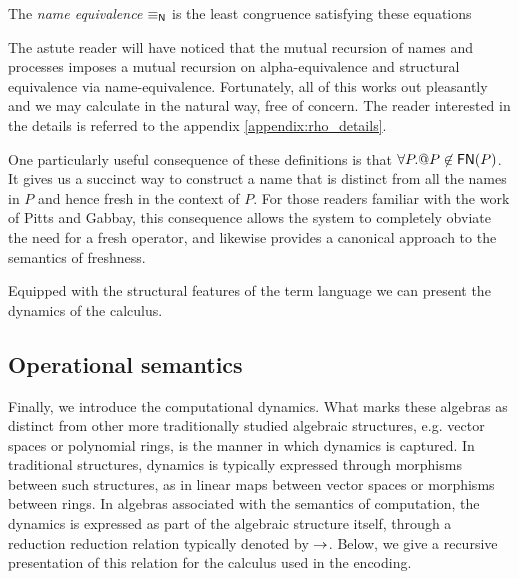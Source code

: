 \begin{definition}
  The {\em name equivalence} $\mathsf{\equiv_N}$ is the least congruence
  satisfying these equations
\end{definition}

The astute reader will have noticed that the mutual recursion of names
and processes imposes a mutual recursion on alpha-equivalence and
structural equivalence via name-equivalence. Fortunately, all of this
works out pleasantly and we may calculate in the natural way, free of
concern. The reader interested in the details is referred to the
appendix \ref{appendix:rho_details}.

\begin{remark}\label{rem:no_self_referential_names}
  One particularly useful consequence of these definitions is that
  $\forall P. \mathsf{@} P \not\in \mathsf{FN}(P)$. It gives us a
  succinct way to construct a name that is distinct from all the names
  in $P$ and hence fresh in the context of $P$. For those readers
  familiar with the work of Pitts and Gabbay, this consequence allows
  the system to completely obviate the need for a fresh operator, and
  likewise provides a canonical approach to the semantics of
  freshness.
\end{remark}

Equipped with the structural features of the term language we can
present the dynamics of the calculus.

\subsection{Operational semantics}

Finally, we introduce the computational dynamics. What marks these
algebras as distinct from other more traditionally studied algebraic
structures, e.g. vector spaces or polynomial rings, is the manner in
which dynamics is captured. In traditional structures, dynamics is typically
expressed through morphisms between such structures, as in linear maps
between vector spaces or morphisms between rings. In algebras
associated with the semantics of computation, the dynamics is
expressed as part of the algebraic structure itself, through a
reduction reduction relation typically denoted by $\rightarrow$. Below, we
give a recursive presentation of this relation for the calculus used
in the encoding.

